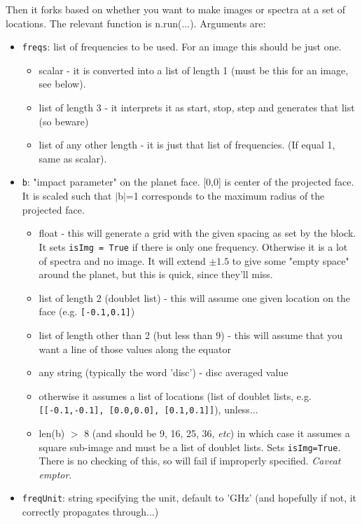 \documentclass[11pt]{article}
\begin{document}
Then it forks based on whether you want to make images or spectra at a set of locations.  The relevant function is n.run(...).  Arguments are:
\begin{itemize}
\item \texttt{freqs}:   list of frequencies to be used. For an image this should be just one.
	\begin{itemize}
	\item scalar - it is converted into a list of length 1 (must be this for an image, see below).
	\item list of length 3 - it interprets it as start, stop, step and generates that list (so beware)
        \item list of any other length - it is just that list of frequencies.  (If equal 1, same as scalar).
	\end{itemize}
\item \texttt{b}:  "impact parameter" on the planet face.  [0,0] is center of the projected face.  It is scaled such that $|$b$|$=1 corresponds to the maximum radius of the projected face.
	\begin{itemize}
	\item float - this will generate a grid with the given spacing as set by the block.  It sets \texttt{isImg = True} if there is only one frequency.  Otherwise it is a lot of spectra and no image.  It will extend $\pm 1.5$ to give some "empty space" around the planet, but this is quick, since they'll miss.
	\item list of length 2 (doublet list) - this will assume one given location on the face (e.g. \texttt{[-0.1,0.1]})
	\item list of length other than 2 (but less than 9) - this will assume that you want a line of those values along the equator
	\item any string (typically the word 'disc') - disc averaged value
	\item otherwise it assumes a list of locations (list of doublet lists, e.g. \texttt{[[-0.1,-0.1], }\texttt{[0.0,0.0], }\texttt{[0.1,0.1]]}), unless...
	\item len(b) $>$ 8 (and should be 9, 16, 25, 36, {\em etc}) in which case it assumes a square sub-image and must be a list of doublet lists.  Sets \texttt{isImg=True}.  There is no checking of this, so will fail if improperly specified.  {\em Caveat emptor}.
	\end{itemize}
\item \texttt{freqUnit}:  string specifying the unit, default to 'GHz' (and hopefully if not, it correctly propagates through...)

\end{itemize}
\end{document}

